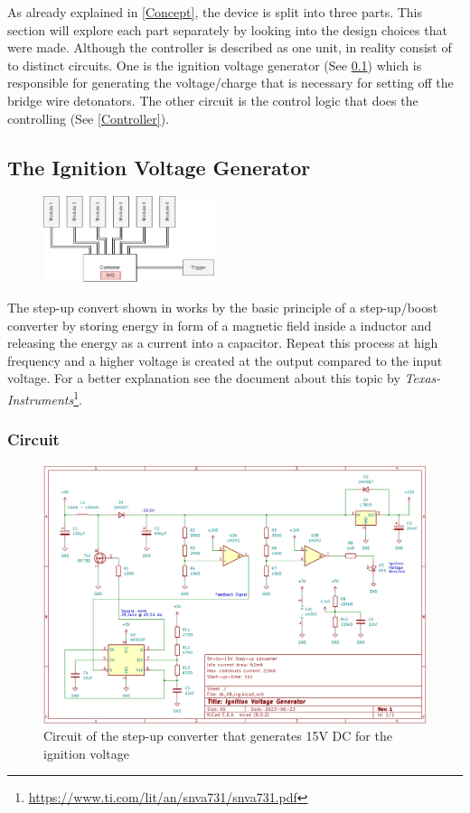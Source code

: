 As already explained in \cref{Concept}, the device is split into three parts. This section will explore each part separately by looking into the design choices that were made. Although the controller is described as one unit, in reality consist  of to distinct circuits. One is the ignition voltage generator (See \cref{Ignition Voltage Generator}) which is responsible for generating the voltage/charge that is necessary for setting off the bridge wire detonators. The other circuit is the control logic that does the controlling (See \cref{Controller}).


\subsection{The Ignition Voltage Generator}
\label{Ignition Voltage Generator}

\begin{figure}[!ht]
    \centering
    \includegraphics[width=5cm]{./Figures/concept_ivg.png} 
\end{figure}

\noindent The step-up convert shown in  works by the basic principle of a step-up/boost converter by storing energy in form of a magnetic field inside a inductor and releasing the energy as a current into a capacitor. Repeat this process at high frequency and a higher voltage is created at the output compared to the input voltage. For a better explanation see the document about this topic by \textit{Texas-Instruments}\footnote{\url{https://www.ti.com/lit/an/snva731/snva731.pdf}}.


\subsubsection{Circuit}

\begin{figure}[!ht]
    \centering
    \includegraphics[width=15cm]{./Figures/ivg_circuit.png}
    \caption{Circuit of the step-up converter that generates 15V DC for the ignition voltage}
    \label{fig:ivg_circuit}     
\end{figure}

